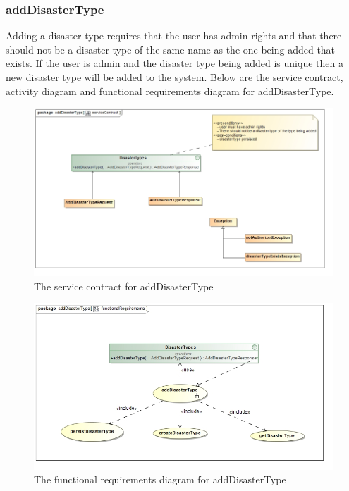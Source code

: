 \subsubsection{addDisasterType}

Adding a disaster type requires that the user has admin rights and that there should not be a disaster type of the same name as the one being added that exists. If the user is admin and the disaster type being added is unique then a new disaster type will be added to the system. Below are the service contract, activity diagram and functional requirements diagram for addDisasterType.

\begin{figure}[H]
	\centering
	\includegraphics[width=1.0\textwidth]{../images/funcReq/addDisasterTypeServiceContract.jpg}
	\caption{The service contract for addDisasterType \label{overflow}}
\end{figure}

\begin{figure}[H]
	\centering
	\includegraphics[width=1.0\textwidth]{../images/funcReq/AddDisasterTypeFunctionalRequirements.jpg}
	\caption{The functional requirements diagram for addDisasterType \label{overflow}}
\end{figure}

